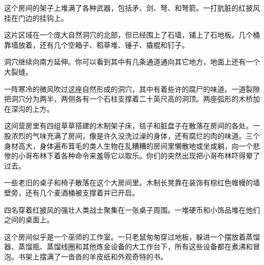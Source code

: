 \documentclass[letterpaper,twocolumn,openany,nodeprecatedcode]{dndbook}
\begin{document}
\begin{DndReadAloud}
  \begin{chinese}
    这个房间的架子上堆满了各种武器，包括矛、剑、弩、和弩箭。一打肮脏的红披风挂在门边的挂钩上。
  \end{chinese}
\end{DndReadAloud}

\begin{DndReadAloud}
  \begin{chinese}
    这片区域在一个庞大自然洞穴的北部，但已经围上了石墙，铺上了石地板。几个桶靠墙放着，还有几个空箱子、稻草堆、锤子、撬棍和钉子。

    洞穴继续向南方延伸。你可以看到其中有几条通道通向其它地方，地面上还有一个大裂缝。
  \end{chinese}
\end{DndReadAloud}

\begin{DndReadAloud}
  \begin{chinese}
    一阵寒冷的微风吹过这座自然形成的洞穴，其中有着些许的腐尸的味道。一道裂隙把洞穴分为两半，两侧各有一个石柱支撑着二十英尺高的洞顶。两座弧形的木桥加在深沟的上方。
  \end{chinese}
\end{DndReadAloud}

\begin{DndReadAloud}
  \begin{chinese}
    这间营房里有四组草草搭建的木制架子床，毯子和脏盘子在散落在房间的各处。一股浓烈的气味充满了房间，像是许久没洗过澡的身体，还有腐烂的肉的味道。三个身材高大，身体遍布茸毛的类人生物在乱糟糟的房间里懒散地或坐或躺，向一个悲惨的小哥布林下着各种命令来羞辱它以取乐。你们的突然出现把小哥布林吓得晕了过去。
  \end{chinese}
\end{DndReadAloud}

\begin{DndReadAloud}
  \begin{chinese}
    一些老旧的桌子和椅子散落在这个大房间里。木制长凳靠在装饰有棕红色帷幔的墙壁旁，还有几个麦酒桶被支撑着并已开启。

    四名穿着红披风的强壮人类战士聚集在一张桌子周围。一堆硬币和小饰品堆在他们之间的桌面上。
  \end{chinese}
\end{DndReadAloud}

\begin{DndReadAloud}
  \begin{chinese}
    这个房间似乎是一个巫师的工作室。一只老鼠匆匆穿过地板，躲进一个摆放着蒸馏器、蒸馏瓶、蒸馏线圈和其他炼金设备的大工作台下，所有这些设备都在煮沸和冒泡。书架上摆满了一沓沓的羊皮纸和外观奇特的书。
  \end{chinese}
\end{DndReadAloud}
\end{document}
